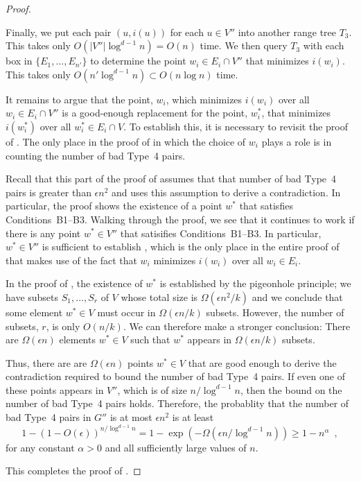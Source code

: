 \documentclass{patmorin}
\begin{document}
\begin{proof}
\begin{enumerate}
      Finally, we put each pair $(u,i(u))$ for each $u\in V''$ into
      another range tree $T_3$.  This takes only $O(|V''|\log^{d-1}
      n)=O(n)$ time.  We then query $T_3$ with each box in
      $\{E_1,\ldots,E_{n'}\}$ to determine the point $w_i\in E_i\cap V''$
      that minimizes $i(w_i)$.  This takes only $O(n'\log^{d-1}n)\subset
      O(n\log n)$ time.

      It remains to argue that the point, $w_i$, which minimizes $i(w_i)$
      over all $w_i\in E_{i}\cap V''$ is a good-enough replacement for
      the point, $w_i^*$, that minimizes $i(w_i^*)$ over all $w_i^*\in
      E_i\cap V$.  To establish this, it is necessary to revisit the
      proof of .  The only place in the proof of
       in which the choice of $w_i$ plays a role is
      in counting the number of bad Type~4 pairs.

      Recall that this part of the proof of  assumes
      that that number of bad Type~4 pairs is greater than $\epsilon
      n^2$ and uses this assumption to derive a contradiction.
      In particular, the proof shows the existence of a point $w^*$
      that satisfies Conditions~B1--B3.  Walking through the proof, we
      see that it continues to work if there is any point $w^*\in V''$
      that satisifies Conditions~B1--B3.  In particular, $w^*\in V''$
      is sufficient to establish , which is the only place
      in the entire proof of  that makes use of the
      fact that $w_i$ minimizes $i(w_i)$ over all $w_i\in E_i$.

      In the proof of , the existence of $w^*$
      is established by the pigeonhole principle; we have subsets
      $S_1,\ldots,S_r$ of $V$ whose total size is $\Omega(\epsilon
      n^2/k)$ and we conclude that some element $w^*\in V$ must occur in
      $\Omega(\epsilon n/k)$ subsets.  However, the number of subsets,
      $r$, is only $O(n/k)$.  We can therefore make a stronger conclusion:
      There are $\Omega(\epsilon n)$ elements $w^*\in V$ such that $w^*$
      appears in $\Omega(\epsilon n/k)$ subsets.

      Thus, there are are $\Omega(\epsilon n)$ points $w^*\in V$ that
      are good enough to derive the contradiction required to bound the
      number of bad Type~4 pairs.  If even one of these points appears
      in $V''$, which is of size $n/\log^{d-1} n$, then the bound on
      the number of bad Type~4 pairs holds.  Therefore, the probablity
      that the number of bad Type~4 pairs in $G''$ is at most $\epsilon n^2$
      is at least
      \[
         1-(1-O(\epsilon))^{n/\log^{d-1} n} 
            = 1-\exp(-\Omega(\epsilon n/\log^{d-1} n)) 
            \ge 1 - n^{\alpha} \enspace ,
      \]
      for any constant $\alpha >0$ and all sufficiently large values of $n$.
  \end{enumerate}
  This completes the proof of .
\end{proof}
\end{document}

